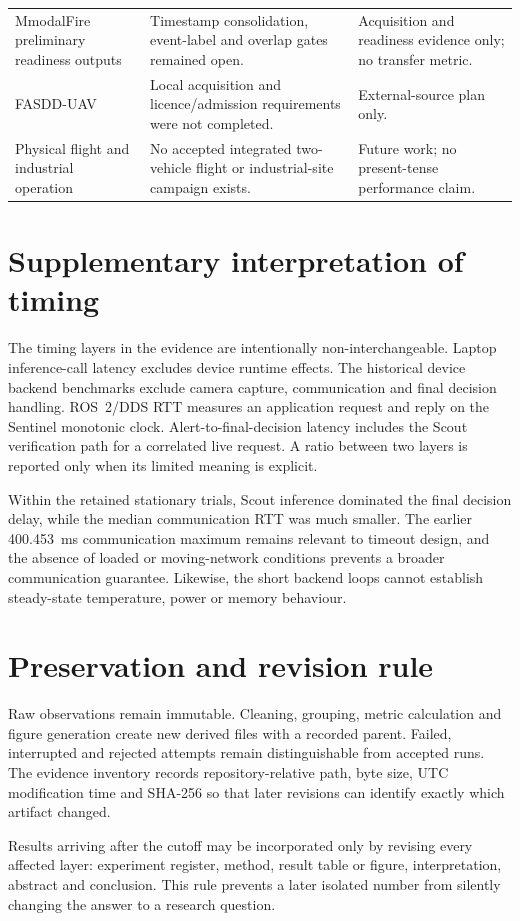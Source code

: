 \begin{table}[H]
\begin{tabularx}{\textwidth}{@{}p{}p{}X@{}}
    MmodalFire preliminary readiness outputs & Timestamp consolidation,
    event-label and overlap gates remained open. & Acquisition and readiness
    evidence only; no transfer metric. \\
    FASDD-UAV & Local acquisition and licence/admission requirements were not
    completed. & External-source plan only. \\
    Physical flight and industrial operation & No accepted integrated
    two-vehicle flight or industrial-site campaign exists. & Future work; no
    present-tense performance claim. \\
    \bottomrule
  \end{tabularx}
\end{table}

\section{Supplementary interpretation of timing}

The timing layers in the evidence are intentionally non-interchangeable.
Laptop inference-call latency excludes device runtime effects. The historical
device backend benchmarks exclude camera capture, communication and final
decision handling. ROS~2/DDS RTT measures an application request and reply on
the Sentinel monotonic clock. Alert-to-final-decision latency includes the
Scout verification path for a correlated live request. A ratio between two
layers is reported only when its limited meaning is explicit.

Within the retained stationary trials, Scout inference dominated the final
decision delay, while the median communication RTT was much smaller. The
earlier 400.453~ms communication maximum remains relevant to timeout design,
and the absence of loaded or moving-network conditions prevents a broader
communication guarantee. Likewise, the short backend loops cannot establish
steady-state temperature, power or memory behaviour.

\section{Preservation and revision rule}

Raw observations remain immutable. Cleaning, grouping, metric calculation and
figure generation create new derived files with a recorded parent. Failed,
interrupted and rejected attempts remain distinguishable from accepted runs.
The evidence inventory records repository-relative path, byte size, UTC
modification time and SHA-256 so that later revisions can identify exactly
which artifact changed.

Results arriving after the cutoff may be incorporated only by revising every
affected layer: experiment register, method, result table or figure,
interpretation, abstract and conclusion. This rule prevents a later isolated
number from silently changing the answer to a research question.

